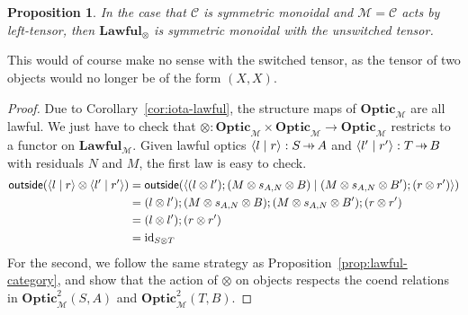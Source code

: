 \documentclass[11pt,letterpaper]{article}
\theoremstyle{plain}
\newtheorem{proposition}[theorem]{Proposition}
\theoremstyle{definition}
\newcommand{\C}{\mathscr{C}}
\newcommand{\M}{\mathscr{M}}
\newcommand{\Optic}{\mathbf{Optic}}
\newcommand{\Twoptic}{\mathbf{Optic}^2}
\newcommand{\Lawful}{\mathbf{Lawful}}
\newcommand{\id}{\mathrm{id}}
\newcommand{\rep}[2]{{\ensuremath \left\langle #1 \mid #2 \right\rangle}}
\newcommand{\outside}{\mathsf{outside}}
\newcommand{\hto}{\ensuremath{\,\mathaccent\shortmid\rightarrow\,}}
\begin{document}
\begin{proposition}
  In the case that $\C$ is symmetric monoidal and $\M = \C$ acts by left-tensor, then $\Lawful_\otimes$ is symmetric monoidal with the unswitched tensor.
\end{proposition}
This would of course make no sense with the switched tensor, as the tensor of two objects would no longer be of the form $(X, X)$.
\begin{proof}
Due to Corollary~\ref{cor:iota-lawful}, the structure maps of $\Optic_\M$ are all lawful. We just have to check that $\otimes : \Optic_\M \times \Optic_\M \to \Optic_\M$ restricts to a functor on $\Lawful_\M$. Given lawful optics $\rep{l}{r} : S \hto A$ and $\rep{l'}{r'} : T \hto B$ with residuals $N$ and $M$, the first law is easy to check.
\begin{align*}
\outside(\rep{l}{r} \otimes \rep{l'}{r'})
&= \outside(\rep{(l \otimes l');(M \otimes s_{A,N} \otimes B)}{(M \otimes s_{A,N} \otimes B');(r \otimes r')}) \\
&= (l \otimes l');(M \otimes s_{A,N} \otimes B);(M \otimes s_{A,N} \otimes B');(r \otimes r') \\
&= (l \otimes l');(r \otimes r') \\
&= \id_{S \otimes T}
\end{align*}
For the second, we follow the same strategy as Proposition~\ref{prop:lawful-category}, and show that the action of $\otimes$ on objects respects the coend relations in $\Twoptic_\M(S, A)$ and $\Twoptic_\M(T, B)$.


\end{proof}
\end{document}
